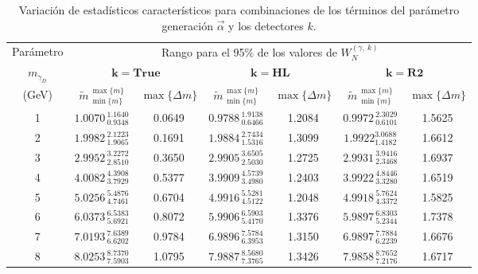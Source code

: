 \begin{table}[!t]
\centering
\footnotesize%
\begin{tabular}{|c|cccccc|}
\toprule
Parámetro& \multicolumn{6}{c|}{Rango para el 95\% de los valores de $W_N^{(\gamma, ~ k)}$ }\\
$m_{\gamma_D}$ & \multicolumn{2}{c}{$\mathbf{k = True}$} & \multicolumn{2}{c}{$\mathbf{k = HL}$} & \multicolumn{2}{c|}{$\mathbf{k = R2}$}\\
(GeV)
& $\widetilde{m}^{~\max{\{m\}}}_{~\min{\{m\}}}$ & $\max{\{\Delta m\}}$
& $\widetilde{m}^{~\max{\{m\}}}_{~\min{\{m\}}}$ & $\max{\{\Delta m\}}$ 
& $\widetilde{m}^{~\max{\{m\}}}_{~\min{\{m\}}}$ & $\max{\{\Delta m\}}$ \\
\midrule
1 & $1.0070^{~1.1640}_{~0.9348}$ & 0.0649 & $0.9788^{~1.9138}_{~0.6466}$ & 1.2084 & $0.9972^{~2.3029}_{~0.6101}$ & 1.5625 \\ \midrule
2 & $1.9982^{~2.1223}_{~1.9065}$ & 0.1691 & $1.9884^{~2.7434}_{~1.5316}$ & 1.3099 & $1.9922^{3.0688}_{1.4182}$ & 1.6612\\ \midrule
3 & $2.9952^{~3.2272}_{~2.8510}$ & 0.3650 & $2.9905^{~3.6505}_{~2.5030}$ & 1.2725 & $2.9931^{~3.9416}_{~2.3468}$ & 1.6937\\ \midrule
4 & $4.0082^{~4.3908}_{~3.7929}$ & 0.5377 & $3.9909^{~4.5739}_{~3.4980}$ & 1.2403 & $3.9922^{~4.8446}_{~3.3280}$ & 1.6519\\ \midrule
5 & $5.0256^{~5.4876}_{~4.7461}$ & 0.6704 & $4.9916^{~5.5281}_{~4.5122}$ & 1.2048 & $4.9918^{~5.7624}_{~4.3372}$ & 1.5825 \\ \midrule
6 & $6.0373^{~6.5383}_{~5.6921}$ & 0.8072 & $5.9906^{~6.5903}_{~5.4170}$ & 1.3376 & $5.9897^{~6.8303}_{~5.2344}$ & 1.7378\\ \midrule
7 & $7.0193^{~7.6389}_{~6.6202}$ & 0.9784 & $6.9896^{~7.5784}_{~6.3953}$ & 1.3150 & $6.9897^{~7.7884}_{~6.2239}$ & 1.6676\\ \midrule
8 & $8.0253^{~8.7370}_{~7.5903}$ & 1.0795 & $7.9887^{~8.5680}_{~7.3765}$ & 1.3426 & $7.9858^{~8.7652}_{~7.2176}$ & 1.6717\\
\bottomrule 
\end{tabular}
\caption{Variación de estadísticos característicos para combinaciones de los términos del parámetro generación $\vec{\alpha}$ y los detectores $k$.}
\label{mass0}
\end{table}



